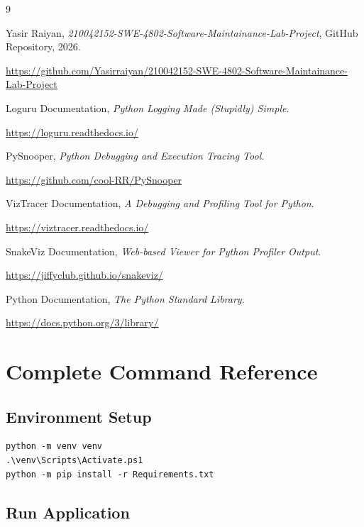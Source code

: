 \documentclass[12pt,a4paper]{report}
\begin{document}
\begin{thebibliography}{9}

Yasir Raiyan,
\textit{210042152-SWE-4802-Software-Maintainance-Lab-Project},
GitHub Repository, 2026.

\url{https://github.com/Yasirraiyan/210042152-SWE-4802-Software-Maintainance-Lab-Project}

Loguru Documentation,
\textit{Python Logging Made (Stupidly) Simple}.

\url{https://loguru.readthedocs.io/}

PySnooper,
\textit{Python Debugging and Execution Tracing Tool}.

\url{https://github.com/cool-RR/PySnooper}

VizTracer Documentation,
\textit{A Debugging and Profiling Tool for Python}.

\url{https://viztracer.readthedocs.io/}

SnakeViz Documentation,
\textit{Web-based Viewer for Python Profiler Output}.

\url{https://jiffyclub.github.io/snakeviz/}

Python Documentation,
\textit{The Python Standard Library}.

\url{https://docs.python.org/3/library/}

\end{thebibliography}


\appendix

\chapter{Complete Command Reference}

\section{Environment Setup}

\begin{lstlisting}
python -m venv venv
.\venv\Scripts\Activate.ps1
python -m pip install -r Requirements.txt
\end{lstlisting}

\section{Run Application}
\end{document}

